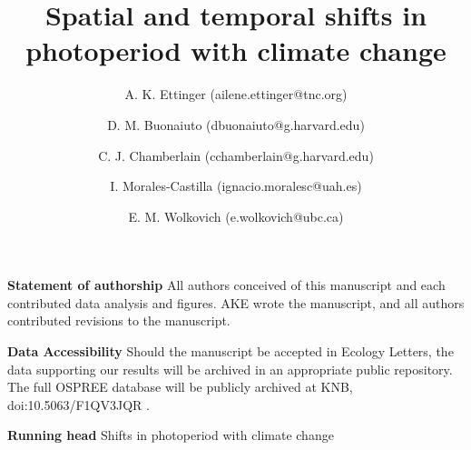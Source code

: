 \documentclass{article}
\begin{document}


\title{Spatial and temporal shifts in photoperiod with climate change} %


\author[1,2,a]{A. K. Ettinger (ailene.ettinger@tnc.org)}
\author[2,3]{D. M. Buonaiuto (dbuonaiuto@g.harvard.edu)}

\author[2,3]{C. J. Chamberlain (cchamberlain@g.harvard.edu)}

\author[2,3,4,5]{I. Morales-Castilla (ignacio.moralesc@uah.es)}

\author[2,3,6]{E. M. Wolkovich (e.wolkovich@ubc.ca)}






 



\maketitle %
\textbf{Statement of authorship} 
All authors conceived of this manuscript and each contributed data analysis and figures. AKE wrote the manuscript, and all authors contributed revisions to the manuscript. 

\textbf{Data Accessibility} Should the manuscript be accepted in Ecology Letters, the data supporting our results will be archived in an appropriate public repository. The full OSPREE database will be publicly archived at KNB, doi:10.5063/F1QV3JQR \citep{wolkovich2019}.

\textbf{Running head} Shifts in photoperiod with climate change
\end{document}
